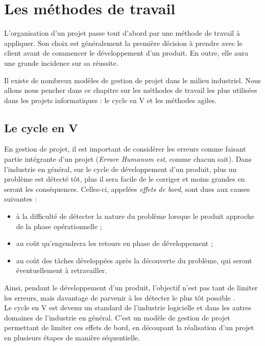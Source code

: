 \chapter{Les méthodes de travail}

L'organisation d'un projet passe tout d'abord par une méthode de travail à appliquer. Son choix est généralement la première décision à prendre avec le client avant de commencer le développement d'un produit. En outre, elle aura une grande incidence sur sa réussite.

Il existe de nombreux modèles de gestion de projet dans le milieu industriel. Nous allons nous pencher dans ce chapitre sur les méthodes de travail les plus utilisées dans les projets informatiques : le cycle en V et les méthodes agiles.

\section{Le cycle en V}

En gestion de projet, il est important de considérer les erreurs comme faisant partie intégrante d'un projet (\textit{Errare Humanum est}, comme chacun sait). Dans l'industrie en général, sur le cycle de développement d'un produit, plus un problème est détecté tôt, plus il sera facile de le corriger et moins grandes en seront les conséquences. Celles-ci, appelées \textit{effets de bord}, sont dues aux causes suivantes :

\begin{itemize}
\item à la difficulté de détecter la nature du problème lorsque le produit approche de la phase opérationnelle ;
\item au coût qu'engendrera les retours en phase de développement ;
\item au coût des tâches développées après la découverte du problème, qui seront éventuellement à retravailler.
\end{itemize}

Ainsi, pendant le développement d'un produit, l'objectif n'est pas tant de limiter les erreurs, mais davantage de parvenir à les détecter le plus tôt possible .\\

Le cycle en V est devenu un standard de l'industrie logicielle et dans les autres domaines de l'industrie en général. C'est un modèle de gestion de projet permettant de limiter ces effets de bord, en découpant la réalisation d'un projet en plusieurs étapes de manière séquentielle.

